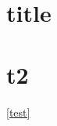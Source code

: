 \documentclass{thesis}
\begin{document}
	\begin{frontmatter}
		\SgAddToc%
	\end{frontmatter}
   
	\section{title}
	\label{test}
	\section{t2}
	\autoref{test}
	
	
\label{Bibliography}
\fancyhead[LO]{\leftmark}
\fancyhead[RE]{\rightmark}
\fancyhead[LE,RO]{\thepage}
\printbibliography


%
\end{document}
